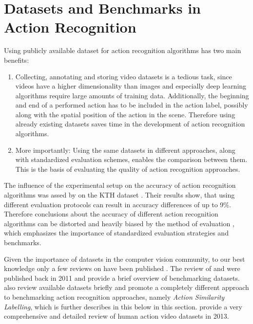 \section{Datasets and Benchmarks in Action Recognition}
\label{chap:datasets}

Using publicly available dataset for action recognition algorithms has two main benefits:
\begin{enumerate}
    \item Collecting, annotating and storing video datasets is a tedious task, since videos have a higher dimensionality than images and especially deep learning algorithms require large amounts of training data. Additionally, the beginning and end of a performed action has to be included in the action label, possibly along with the spatial position of the action in the scene. Therefore using already existing datasets saves time in the development of action recognition algorithms.
    \item More importantly: Using the same datasets in different approaches, along with standardized evaluation schemes, enables the comparison between them. This is the basis of evaluating the quality of action recognition approaches. 
\end{enumerate}

The influence of the experimental setup on the accuracy of action recognition algorithms was assed by \cite{gao_comparing_2010} on the KTH dataset \cite{schuldt_recognizing_2004}.
Their results show, that using different evaluation protocols can result in accuracy differences of up to 9\%.
Therefore conclusions about the accuracy of different action recognition algorithms can be distorted and heavily biased by the method of evaluation \cite{baccouche_sequential_2011}, which emphasizes the importance of standardized evaluation strategies and benchmarks.

Given the importance of datasets in the computer vision community, to our best knowledge only a few reviews on have been published \cite{ahad_action_2011}\cite{liu_benchmarking_2011}\cite{hassner_critical_2013}\cite{chaquet_survey_2013}.
The review of \textcite{ahad_action_2011} and \textcite{liu_benchmarking_2011} were published back in 2011 and provide a brief overview of benchmarking datasets.
\textcite{hassner_critical_2013} also review available datasets briefly and promote a completely different approach to benchmarking action recognition approaches, namely \textit{Action Similarity Labelling}, which is further describes in this below in this section.
\textcite{chaquet_survey_2013} provide a very comprehensive and detailed review of human action video datasets in 2013.

